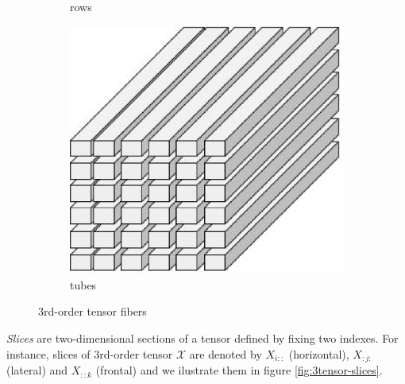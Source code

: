 \documentclass[letterpaper,12pt]{article}
\begin{document}
\begin{figure}[!ht]
\begin{subfigure}[b]{0.33\textwidth}
  \caption{rows}\label{fig:3tensor-rows}
 \end{subfigure}
 \begin{subfigure}[b]{0.33\textwidth}
  \includegraphics[width=\textwidth]{Images/3rd-order-tensor-fiber_mode-3.eps}
  \caption{tubes}\label{fig:3tensor-tubes}
 \end{subfigure}
\caption{3rd-order tensor fibers}\label{fig:3tensor-fibers}
\end{figure}

\textit{Slices} are two-dimensional sections of a tensor defined by fixing two indexes. For instance, slices of 3rd-order tensor $\mathcal{X}$ are denoted by $X_{i::}$ (horizontal), $X_{:j:}$ (lateral) and $X_{::k}$ (frontal) and we ilustrate them in figure \ref{fig:3tensor-slices}.
\end{document}
